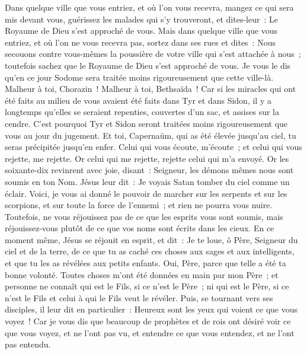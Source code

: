 \begin{multicols}{2}
Dans quelque ville que vous entriez, et où l'on vous recevra, mangez ce qui sera mis devant vous,
guérissez les malades qui s'y trouveront, et dites-leur~: Le Royaume de Dieu s'est approché de vous.
Mais dans quelque ville que vous entriez, et où l'on ne vous recevra pas, sortez dans ses rues et dites~:
Nous secouons contre vous-mêmes la poussière de votre ville qui s'est attachée à nous~; toutefois sachez que le Royaume de Dieu s'est approché de vous.
Je vous le dis qu'en ce jour Sodome sera traitée moins rigoureusement que cette ville-là.
Malheur à toi, Chorazin~! Malheur à toi, Bethsaïda~! Car si les miracles qui ont été faits au milieu de vous avaient été faits dans Tyr et dans Sidon, il y a longtemps qu'elles se seraient repenties, couvertes d'un sac, et assises sur la cendre.
C'est pourquoi Tyr et Sidon seront traitées moins rigoureusement que vous au jour du jugement.
Et toi, Capernaüm, qui as été élevée jusqu'au ciel, tu seras précipitée jusqu'en enfer.
Celui qui vous écoute, m'écoute~; et celui qui vous rejette, me rejette. Or celui qui me rejette, rejette celui qui m'a envoyé.
Or les soixante-dix revinrent avec joie, disant~: Seigneur, les démons mêmes nous sont soumis en ton Nom.
Jésus leur dit~: Je voyais Satan tomber du ciel comme un éclair.
Voici, je vous ai donné le pouvoir de marcher sur les serpents et sur les scorpions, et sur toute la force de l'ennemi~; et rien ne pourra vous nuire.
Toutefois, ne vous réjouissez pas de ce que les esprits vous sont soumis, mais réjouissez-vous plutôt de ce que vos noms sont écrits dans les cieux.
En ce moment même, Jésus se réjouit en esprit, et dit~: Je te loue, ô Père, Seigneur du ciel et de la terre, de ce que tu as caché ces choses aux sages et aux intelligents, et que tu les as révélées aux petits enfants. Oui, Père, parce que telle a été ta bonne volonté.
Toutes choses m'ont été données en main par mon Père~; et personne ne connaît qui est le Fils, si ce n'est le Père~; ni qui est le Père, si ce n'est le Fils et celui à qui le Fils veut le révéler.
Puis, se tournant vers ses disciples, il leur dit en particulier~: Heureux sont les yeux qui voient ce que vous voyez~!
Car je vous dis que beaucoup de prophètes et de rois ont désiré voir ce que vous voyez, et ne l'ont pas vu, et entendre ce que vous entendez, et ne l'ont pas entendu.

\end{multicols}
